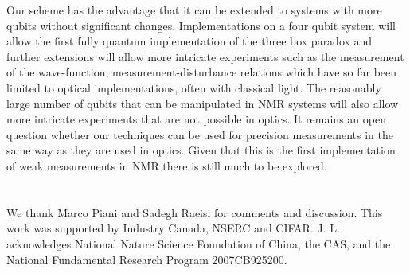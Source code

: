 \documentclass[aps,pra,12pt,onecolumn,showpacs,superscriptaddress,floatfix,footinbib,subfigure]{revtex4}
\begin{document}
Our scheme has the advantage that it can be extended to systems with more qubits without significant changes.  Implementations on a four qubit system will allow the first fully quantum  implementation of the three box paradox  and further extensions will allow more intricate experiments such as the measurement of the wave-function,  measurement-disturbance relations which have so far been limited to optical implementations, often with classical light. The reasonably large number of qubits  that can be manipulated   in NMR systems will also allow more intricate experiments that  are not possible in optics.  It remains an open question whether our techniques can be used for precision measurements in the same way as they are used in optics.  Given that this is the first implementation of weak measurements in NMR there is still much to be explored.

\section*{}
We thank Marco Piani and Sadegh Raeisi for comments and discussion. This work was supported by  Industry Canada, NSERC  and CIFAR. J. L. acknowledges National Nature Science Foundation of China, the CAS, and the National Fundamental Research Program 2007CB925200.
\end{document}
